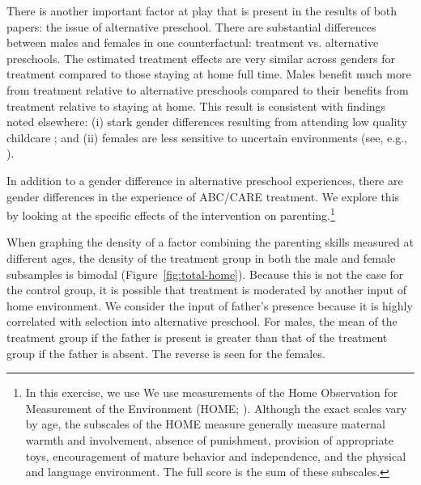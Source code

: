 There is another important factor at play that is present in the results of both papers: the issue of alternative preschool. There are substantial differences between males and females in one counterfactual: treatment vs. alternative preschools. The estimated treatment effects are very similar across genders for treatment compared to those staying at home full time. Males benefit much more from treatment relative to alternative preschools compared to their benefits from treatment relative to staying at home. This result is consistent with findings noted elsewhere: (i) stark gender differences resulting from attending low quality childcare \citep{Kottelenberg-Lehrer_2014_Gender-Effects,Baker_Gruber_Milligan_2015_Noncog_Defects}; and (ii) females are less sensitive to uncertain environments (see, e.g., \citealp{Autor-etal_2015_Family-Disadvantage}).

In addition to a gender difference in alternative preschool experiences, there are gender differences in the experience of ABC/CARE treatment. We explore this by looking at the specific effects of the intervention on parenting.\footnote{In this exercise, we use We use measurements of the Home Observation for Measurement of the Environment (HOME; \citet{Bradley-Caldwell_1977_AJMD}). Although the exact scales vary by age, the subscales of the HOME measure generally measure maternal warmth and involvement, absence of punishment, provision of appropriate toys, encouragement of mature behavior and independence, and the physical and language environment. The full score is the sum of these subscales.}

When graphing the density of a factor combining the parenting skills measured at different ages, the density of the treatment group in both the male and female subsamples is bimodal (Figure~\ref{fig:total-home}). Because this is not the case for the control group, it is possible that treatment is moderated by another input of home environment. We consider the input of father's presence because it is highly correlated with selection into alternative preschool. For males, the mean of the treatment group if the father is present is greater than that of the treatment group if the father is absent. The reverse is seen for the females. 


